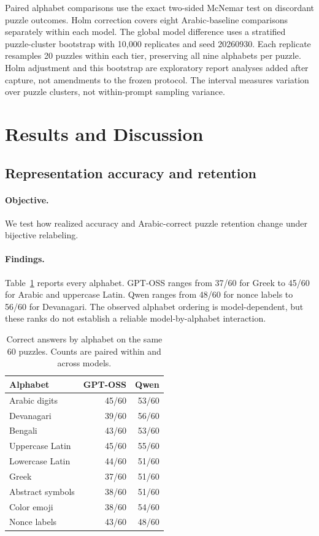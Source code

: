\documentclass[11pt]{article}
\begin{document}
Paired alphabet comparisons use the exact two-sided McNemar test on discordant puzzle outcomes. Holm correction covers eight Arabic-baseline comparisons separately within each model. The global model difference uses a stratified puzzle-cluster bootstrap with 10,000 replicates and seed 20260930. Each replicate resamples 20 puzzles within each tier, preserving all nine alphabets per puzzle. Holm adjustment and this bootstrap are exploratory report analyses added after capture, not amendments to the frozen protocol. The interval measures variation over puzzle clusters, not within-prompt sampling variance.

\section{Results and Discussion}
\subsection{Representation accuracy and retention}
\paragraph{Objective.} We test how realized accuracy and Arabic-correct puzzle retention change under bijective relabeling.
\paragraph{Findings.} Table~\ref{tab:representation} reports every alphabet. GPT-OSS ranges from 37/60 for Greek to 45/60 for Arabic and uppercase Latin. Qwen ranges from 48/60 for nonce labels to 56/60 for Devanagari. The observed alphabet ordering is model-dependent, but these ranks do not establish a reliable model-by-alphabet interaction.

\begin{table}[t]
\centering\small
\begin{tabular}{lrr}
\toprule
Alphabet & GPT-OSS & Qwen\\
\midrule
Arabic digits & 45/60 & 53/60\\
Devanagari & 39/60 & 56/60\\
Bengali & 43/60 & 53/60\\
Uppercase Latin & 45/60 & 55/60\\
Lowercase Latin & 44/60 & 51/60\\
Greek & 37/60 & 51/60\\
Abstract symbols & 38/60 & 51/60\\
Color emoji & 38/60 & 54/60\\
Nonce labels & 43/60 & 48/60\\
\bottomrule
\end{tabular}
\caption{Correct answers by alphabet on the same 60 puzzles. Counts are paired within and across models.}
\label{tab:representation}
\end{table}
\end{document}
